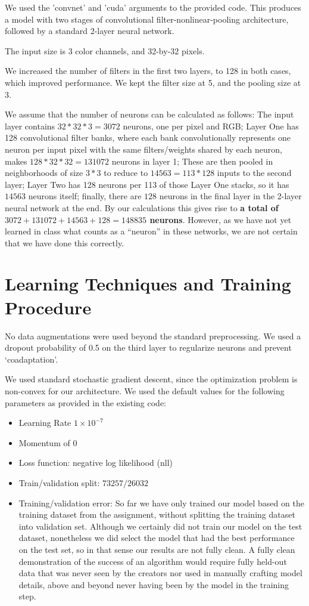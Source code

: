 \documentclass{article}
\begin{document}
We used the 'convnet' and 'cuda' arguments to the provided code. This produces a model with two stages of convolutional filter-nonlinear-pooling architecture, followed by a standard 2-layer neural network.

The input size is 3 color channels, and 32-by-32 pixels.

We increased the number of filters in the first two layers, to 128 in both cases, which improved performance. We kept the filter size at 5, and the pooling size at 3.

We assume that the number of neurons can be calculated as follows: The input layer contains $32*32*3=3072$ neurons, one per pixel and RGB; Layer One has 128 convolutional filter banks, where each bank convolutionally represents one neuron per input pixel with the same filters/weights shared by each neuron, makes $128 * 32*32 = 131072$ neurons in layer 1; These are then pooled in neighborhoods of size $3*3$ to reduce to $14563 = 113*128$ inputs to the second layer; Layer Two has 128 neurons per 113 of those Layer One stacks, so it has $14563$ neurons itself; finally, there are $128$ neurons in the final layer in the 2-layer neural network at the end. By our calculations this gives rise to \textbf{a total of $3072 + 131072 + 14563 + 128 = 148835$ neurons}. However, as we have not yet learned in class what counts as a ``neuron'' in these networks, we are not certain that we have done this correctly.

\section{Learning Techniques and Training Procedure}
No data augmentations were used beyond the standard preprocessing. We used a dropout probability of 0.5 on the third layer to regularize neurons and prevent `coadaptation'.

We used standard stochastic gradient descent, since the optimization problem is
non-convex for our architecture. We used the default values for the following parameters as provided in the existing code:
\begin{itemize}
\item Learning Rate $1 \times 10^{-7}$
\item Momentum of $0$
\item Loss function: negative log likelihood (nll)
\item Train/validation split: $73257/26032$
\item Training/validation error: So far we have only trained our model based on the training dataset from the assignment, without splitting the training dataset into validation set. Although we certainly did not train our model on the test dataset, nonetheless we did select the model that had the best performance on the test set, so in that sense our results are not fully clean. A fully clean demonstration of the success of an algorithm would require fully held-out data that was never seen by the creators nor used in manually crafting model details, above and beyond never having been by the model in the training step.
\end{itemize}
\end{document}
